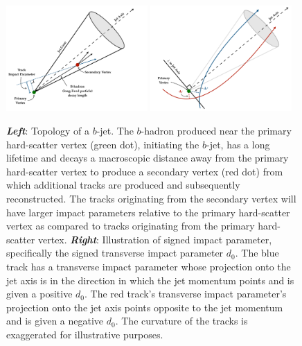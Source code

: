 \begin{figure}[!htb]
    \begin{center}
        \includegraphics[width=0.48\textwidth]{figures/chapter3/ftag/bhadron_decayPDF}
        \includegraphics[width=0.48\textwidth]{figures/chapter3/ftag/bhadron_signed_d0PDF}
        \caption{
            \textbf{\textit{Left}}:
            Topology of a $b$-jet.
            The $b$-hadron produced near the primary hard-scatter vertex (green dot), initiating the
            $b$-jet, has a long lifetime and decays a macroscopic distance away from the primary
            hard-scatter vertex to produce a secondary vertex (red dot) from which additional tracks
            are produced and subsequently reconstructed.
            The tracks originating from the secondary vertex will have larger impact parameters relative
            to the primary hard-scatter vertex as compared to tracks originating from the primary
            hard-scatter vertex.
            \textbf{\textit{Right}}:
            Illustration of signed impact parameter, specifically the signed transverse impact
            parameter $d_0$. The blue track has a transverse impact parameter whose projection onto the jet axis
            is in the direction in which the jet momentum points and is given a positive $d_0$.
            The red track's transverse impact parameter's projection onto the jet axis points opposite to the jet
            momentum and is given a negative $d_0$.
            The curvature of the tracks is exaggerated for illustrative purposes.
        }
        \label{fig:bjet_decay}
    \end{center}
\end{figure}

